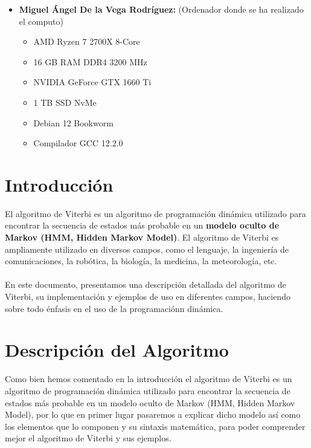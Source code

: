 \documentclass[11pt,openany]{book}
\begin{document}
\begin{itemize}
      \item \textbf{Miguel Ángel De la Vega Rodríguez:} (Ordenador donde se ha realizado el computo)
            \begin{itemize}
                  \item AMD Ryzen 7 2700X 8-Core
                  \item 16 GB RAM DDR4 3200 MHz
                  \item NVIDIA GeForce GTX 1660 Ti
                  \item 1 TB SSD NvMe
                  \item Debian 12 Bookworm
                  \item Compilador GCC 12.2.0
            \end{itemize}
\end{itemize}

\chapter{Introducción}
El algoritmo de Viterbi es un algoritmo de programación dinámica utilizado para encontrar la secuencia de estados más probable en un \textbf{modelo oculto de Markov 
(HMM, Hidden Markov Model)}. El algoritmo de Viterbi es ampliamente utilizado en diversos campos, como el lenguaje, la ingeniería de comunicaciones, la robótica, la 
biología, la medicina, la meteorología, etc. \\ \\
En este documento, presentamos una descripción detallada del algoritmo de Viterbi, su implementación y ejemplos de uso 
en diferentes campos, haciendo sobre todo énfasis en el uso de la programaciónn dinámica. 

\chapter{Descripción del Algoritmo}
Como bien hemos comentado en la introducción el algoritmo de Viterbi es un algoritmo de programación dinámica utilizado para encontrar la secuencia de estados más probable en un 
modelo oculto de Markov (HMM, Hidden Markov Model), por lo que en primer lugar pasaremos a explicar dicho modelo así como los elementos que lo componen y su sintaxis matemática, 
para poder comprender mejor el algoritmo de Viterbi y sus ejemplos.
\end{document}
